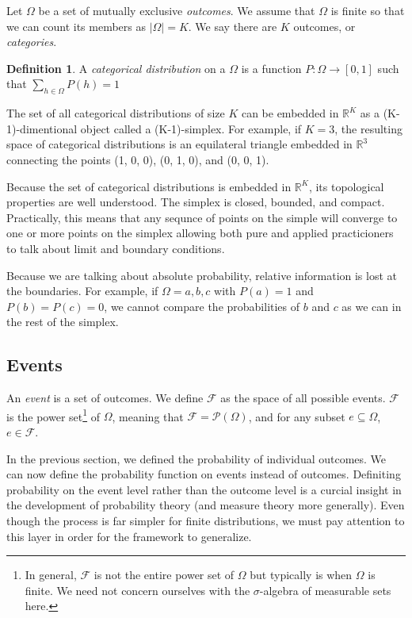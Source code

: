 \documentclass[twoside]{article}
\theoremstyle{plain}%
\theoremstyle{definition}
\newtheorem{definition}{Definition}[section]
\theoremstyle{remark}
\begin{document}
Let \(\Omega\) be a set of mutually exclusive \textit{outcomes}. We assume that \(\Omega\) is finite so that we can count its members as \(|\Omega| = K\). We say there are \(K\) outcomes, or \textit{categories}.

\begin{definition}
A \textit{categorical distribution} on a \(\Omega\) is a function \(P: \Omega \rightarrow [0, 1]\) such that \(\sum_{h \in \Omega} P(h) = 1\)
\end{definition}

The set of all categorical distributions of size \(K\) can be embedded in \(\mathbb{R}^K\) as a (K-1)-dimentional object called a (K-1)-simplex. For example, if \(K = 3\), the resulting space of categorical distributions is an equilateral triangle embedded in \(\mathbb{R}^3\) connecting the points (1, 0, 0), (0, 1, 0), and (0, 0, 1).

Because the set of categorical distributions is embedded in \(\mathbb{R}^K\), its topological properties are well understood. The simplex is closed, bounded, and compact. Practically, this means that any sequnce of points on the simple will converge to one or more points on the simplex allowing both pure and applied practicioners to talk about limit and boundary conditions.

Because we are talking about absolute probability, relative information is lost at the boundaries. For example, if \(\Omega = {a, b, c}\) with \(P(a) = 1\) and \(P(b) = P(c) = 0\), we cannot compare the probabilities of \(b\) and \(c\) as we can in the rest of the simplex.

\subsection{Events}

An \textit{event} is a set of outcomes. We define \(\mathcal{F}\) as the space of all possible events. \(\mathcal{F}\) is the power set\footnote{In general, \(\mathcal{F}\) is not the entire power set of \(\Omega\) but typically is when \(\Omega\) is finite. We need not concern ourselves with the \(\sigma\)-algebra of measurable sets here.} of \(\Omega\), meaning that \(\mathcal{F} = \mathcal{P}(\Omega)\), and for any subset \(e \subseteq \Omega\), \(e \in \mathcal{F}\).

In the previous section, we defined the probability of individual outcomes. We can now define the probability function on events instead of outcomes. Definiting probability on the event level rather than the outcome level is a curcial insight in the development of probability theory (and measure theory more generally). Even though the process is far simpler for finite distributions, we must pay attention to this layer in order for the framework to generalize.
\end{document}

